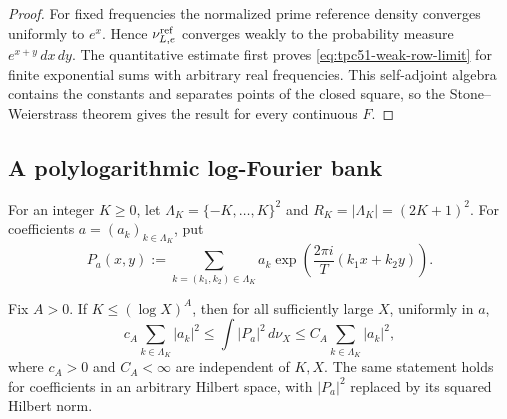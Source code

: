 \begin{proof}
For fixed frequencies the normalized prime reference density converges
uniformly to \(e^x\).  Hence
\(\nu_{L,e}^{\rm ref}\) converges weakly to the probability measure
\(e^{x+y}\,dx\,dy\).  The quantitative estimate first proves
\eqref{eq:tpc51-weak-row-limit} for finite exponential sums with
arbitrary real frequencies.  This self-adjoint algebra contains the
constants and separates points of the closed square, so the
Stone--Weierstrass theorem gives the result for every continuous \(F\).
\end{proof}

\subsection{A polylogarithmic log-Fourier bank}

For an integer \(K\geq0\), let
\(\Lambda_K=\{-K,\ldots,K\}^2\) and
\(R_K=|\Lambda_K|=(2K+1)^2\).  For coefficients
\(a=(a_k)_{k\in\Lambda_K}\), put
\begin{equation}
 P_a(x,y):=\sum_{k=(k_1,k_2)\in\Lambda_K}
 a_k\exp\!\left(\frac{2\pi i}{T}(k_1x+k_2y)\right).
 \label{eq:tpc51-log-fourier-polynomial}
\end{equation}

\begin{theorem}
\label{thm:tpc51-polylog-fourier-frame}
Fix \(A>0\).  If \(K\leq(\log X)^A\), then for all sufficiently large
\(X\), uniformly in \(a\),
\begin{equation}
 c_A\sum_{k\in\Lambda_K}|a_k|^2
 \leq \int|P_a|^2\,d\nu_X
 \leq C_A\sum_{k\in\Lambda_K}|a_k|^2,
 \label{eq:tpc51-unmasked-fourier-frame}
\end{equation}
where \(c_A>0\) and \(C_A<\infty\) are independent of \(K,X\).
The same statement holds for coefficients in an arbitrary Hilbert
space, with \(|P_a|^2\) replaced by its squared Hilbert norm.
\end{theorem}

